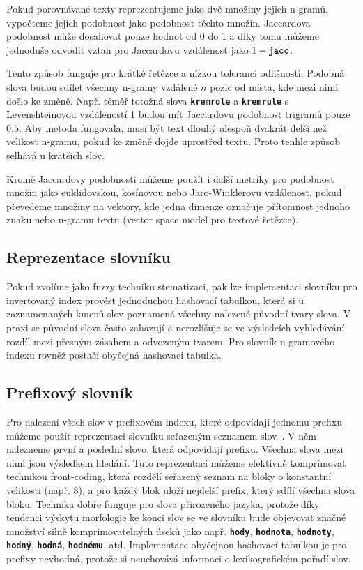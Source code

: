 \documentclass[11pt,letterpaper,oneside,openright]{book}
\newcommand{\bftt}[1]{\texttt{\textbf{#1}}}
\begin{document}
Pokud porovnávané texty reprezentujeme jako dvě množiny jejich n-gramů,
vypočteme jejich podobnost jako podobnost těchto množin. Jaccardova podobnost
může dosahovat pouze hodnot od $0$ do $1$ a díky tomu můžeme jednoduše odvodit
vztah pro Jaccardovu vzdálenost jako $1 - \bftt{jacc}$.

Tento způsob funguje pro krátké řetězce a nízkou toleranci odlišnosti. Podobná
slova budou sdílet všechny n-gramy vzdálené $n$ pozic od místa, kde mezi nimi
došlo ke změně. Např. téměř totožná slova \bftt{kremrole} a \bftt{kremrule} s
Levenshteinovou vzdáleností 1 budou mít Jaccardovu podobnost trigramů pouze
$0.5$. Aby metoda fungovala, musí být text dlouhý alespoň dvakrát delší než
velikost n-gramu, pokud ke změně dojde uprostřed textu. Proto tenhle způsob
selhává u kratších slov.

Kromě Jaccardovy podobnosti můžeme použít i další metriky pro podobnost množin
jako euklidovskou, kosínovou nebo Jaro-Winklerovu vzdálenost, pokud převedeme
množiny na vektory, kde jedna dimenze označuje přítomnost jednoho znaku nebo
n-gramu textu (vector space model pro textové řetězce).


\subsection{Reprezentace slovníku}
Pokud zvolíme jako fuzzy techniku stematizaci, pak lze implementaci slovníku
pro invertovaný index provést jednoduchou hashovací tabulkou, která si u
zaznamenaných kmenů slov poznamená všechny nalezené původní tvary slova. V
praxi se původní slova často zahazují a nerozlišuje se ve výsledcích
vyhledávání rozdíl mezi přesným zásahem a odvozeným tvarem. Pro slovník
n-gramového indexu rovněž postačí obyčejná hashovací tabulka.

\subsection{Prefixový slovník} \label{sec:prefix_dict}
Pro nalezení všech slov v prefixovém indexu, které odpovídají jednomu prefixu
můžeme použít reprezentaci slovníku seřazeným seznamem
slov~\citep[kap.~4]{buttcher2010information}. V něm nalezneme první a poslední
slovo, která odpovídají prefixu. Všechna slova mezi nimi jsou výsledkem
hledání. Tuto reprezentaci můžeme efektivně komprimovat technikou front-coding,
která rozdělí seřazený seznam na bloky o konstantní velikosti (např. 8), a pro
každý blok uloží nejdelší prefix, který sdílí všechna slova bloku. Technika
dobře funguje pro slova přirozeného jazyka, protože díky tendenci výskytu
morfologie ke konci slov se ve slovníku bude objevovat značné množství silně
komprimovatelných úseků jako např. \bftt{hody}, \bftt{hodnota}, \bftt{hodnoty},
\bftt{hodný}, \bftt{hodná}, \bftt{hodnému}, atd. Implementace obyčejnou
hashovací tabulkou je pro prefixy nevhodná, protože si neuchovává informaci o
lexikografickém pořadí slov.
\end{document}
